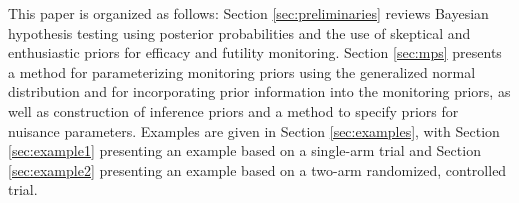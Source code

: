 \documentclass[useAMS,usenatbib,referee]{biom}
\begin{document}
This paper is organized as follows: %
Section \ref{sec:preliminaries} reviews Bayesian hypothesis testing using posterior probabilities and the use of  skeptical and enthusiastic priors for efficacy and futility monitoring. 
%
Section \ref{sec:mps} presents a method for parameterizing monitoring priors using the generalized normal distribution and for incorporating prior information into the monitoring priors, as well as construction of inference priors and a method to specify priors for nuisance parameters.
%
Examples are given in Section \ref{sec:examples}, with Section \ref{sec:example1} presenting an example based on a single-arm trial and Section \ref{sec:example2} presenting an example based on a two-arm randomized, controlled trial.
\end{document}
